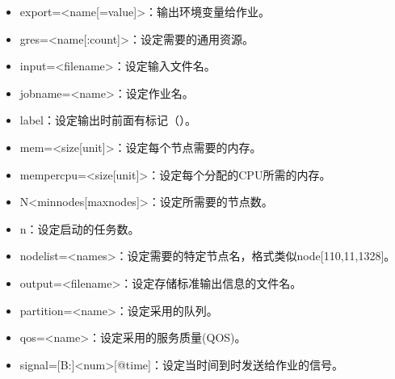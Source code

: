 \documentclass[a4paper,12pt,english]{sphinxmanual}
\begin{document}
\begin{itemize}
\begin{itemize}
\item {} 
\sphinxAtStartPar
\sphinxhyphen{}\sphinxhyphen{}export=<name{[}=value{]}>：输出环境变量给作业。

\item {} 
\sphinxAtStartPar
\sphinxhyphen{}\sphinxhyphen{}gres=<name{[}:count{]}>：设定需要的通用资源。

\item {} 
\sphinxAtStartPar
\sphinxhyphen{}\sphinxhyphen{}input=<filename>：设定输入文件名。

\item {} 
\sphinxAtStartPar
\sphinxhyphen{}\sphinxhyphen{}job\sphinxhyphen{}name=<name>：设定作业名。

\item {} 
\sphinxAtStartPar
\sphinxhyphen{}\sphinxhyphen{}label：设定输出时前面有标记（）。

\item {} 
\sphinxAtStartPar
\sphinxhyphen{}\sphinxhyphen{}mem=<size{[}unit{]}>：设定每个节点需要的内存。

\item {} 
\sphinxAtStartPar
\sphinxhyphen{}\sphinxhyphen{}mem\sphinxhyphen{}per\sphinxhyphen{}cpu=<size{[}unit{]}>：设定每个分配的CPU所需的内存。

\item {} 
\sphinxAtStartPar
\sphinxhyphen{}N<minnodes{[}\sphinxhyphen{}maxnodes{]}>：设定所需要的节点数。

\item {} 
\sphinxAtStartPar
\sphinxhyphen{}n：设定启动的任务数。

\item {} 
\sphinxAtStartPar
\sphinxhyphen{}\sphinxhyphen{}nodelist=<names>：设定需要的特定节点名，格式类似node{[}1\sphinxhyphen{}10,11,13\sphinxhyphen{}28{]}。

\item {} 
\sphinxAtStartPar
\sphinxhyphen{}\sphinxhyphen{}output=<filename>：设定存储标准输出信息的文件名。

\item {} 
\sphinxAtStartPar
\sphinxhyphen{}\sphinxhyphen{}partition=<name>：设定采用的队列。

\item {} 
\sphinxAtStartPar
\sphinxhyphen{}\sphinxhyphen{}qos=<name>：设定采用的服务质量(QOS)。

\item {} 
\sphinxAtStartPar
\sphinxhyphen{}\sphinxhyphen{}signal={[}B:{]}<num>{[}@time{]}：设定当时间到时发送给作业的信号。


\end{itemize}
\end{itemize}
\end{document}
